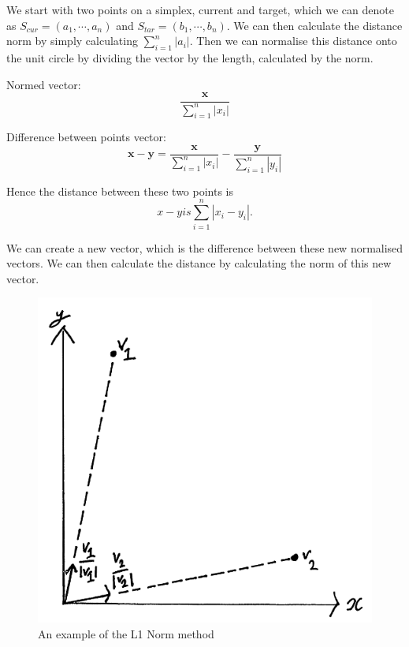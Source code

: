 \documentclass[12pt,a4paper]{report}
\begin{document}
We start with two points on a simplex, current and target, which we can denote as $S_{cur} = (a_{1}, \cdots, a_{n})$ and $S_{tar} = (b_{1}, \cdots, b_{n})$. We can then calculate the distance norm by simply calculating $\sum_{i=1}^{n} |a_{i}|$. Then we can normalise this distance onto the unit circle by dividing the vector by the length, calculated by the norm.

Normed vector:
\begin{equation*}
    \frac{\textbf{x}}{\sum_{i=1}^{n} |x_{i}|}
\end{equation*}

Difference between points vector:
\begin{equation*}
   \textbf{x} - \textbf{y} = \frac{\textbf{x}}{\sum_{i=1}^{n} |x_{i}|} - \frac{\textbf{y}}{\sum_{i=1}^{n} |y_{i}|}
\end{equation*}

Hence the distance between these two points is
\begin{equation*}
x - y is \sum_{i=1}^{n} | x_{i} - y_{i} |.    
\end{equation*}

We can create a new vector, which is the difference between these new normalised vectors. We can then calculate the distance by calculating the norm of this new vector.


\begin{figure}
\includegraphics[scale=0.5]{Chapters/images/L1Norm1.png}
\caption{An example of the L1 Norm method}
\end{figure}
\end{document}
